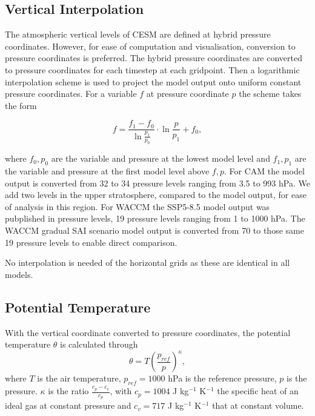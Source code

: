 \subsection{Vertical Interpolation}
The atmospheric vertical levels of CESM are defined at hybrid pressure coordinates. However, for ease of computation and visualisation, conversion to pressure coordinates is preferred. The hybrid pressure coordinates are converted to pressure coordinates for each timestep at each gridpoint. Then a logarithmic interpolation scheme is used to project the model output onto uniform constant pressure coordinates. For a variable $f$ at pressure coordinate $p$ the scheme takes the form

\begin{equation}
    f = \frac{f_1 - f_0}{\ln\frac{p_1}{p_0}} \cdot \ln \frac{p}{p_1} + f_0,
\end{equation}

\noindent where $f_0,p_0$ are the variable and pressure at the lowest model level and $f_1,p_1$ are the variable and pressure at the first model level above $f,p$. 
For CAM the model output is converted from 32 to 34 pressure levels ranging from 3.5 to 993 hPa. We add two levels in the upper stratosphere, compared to the model output, for ease of analysis in this region. For WACCM the SSP5-8.5 model output was pubplished in pressure levels, 19 pressure levels ranging from 1 to 1000 hPa. The WACCM gradual SAI scenario model output is converted from 70 to those same 19 pressure levels to enable direct comparison.

No interpolation is needed of the horizontal grids as these are identical in all models.


\subsection{Potential Temperature}
With the vertical coordinate converted to pressure coordinates, the potential temperature $\theta$ is calculated through
\begin{equation}
    \theta = T\left( \frac{p_{ref}}{p} \right)^\kappa, 
\end{equation}
where $T$ is the air temperature, $p_{ref} = 1000$ hPa is the reference pressure, $p$ is the pressure. $\kappa$ is the ratio $\frac{c_p - c_v}{c_p}$, with $c_p = 1004$ J kg$^{-1}$ K$^{-1}$ the specific heat of an ideal gas at constant pressure and $c_v = 717$ J kg$^{-1}$ K$^{-1}$ that at constant volume. 
